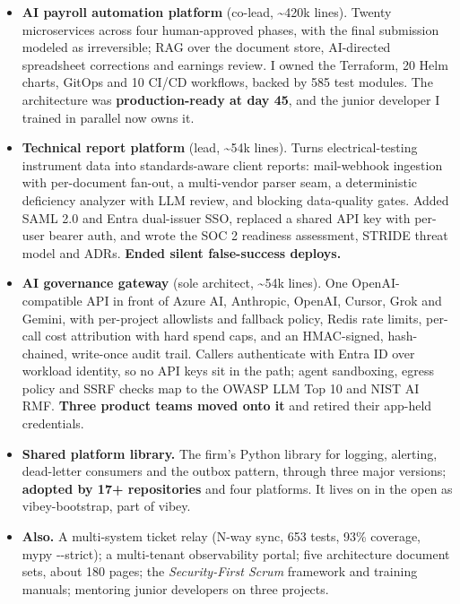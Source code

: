 \documentclass[10pt,letterpaper]{article}
\begin{document}
\begin{itemize}
\item \textbf{AI payroll automation platform} {\color{muted}(co-lead, \textasciitilde{}420k lines)}. Twenty microservices across four human-approved phases, with the final submission modeled as irreversible; RAG over the document store, AI-directed spreadsheet corrections and earnings review. I owned the Terraform, 20 Helm charts, GitOps and 10 CI/CD workflows, backed by 585 test modules. The architecture was \textbf{production-ready at day 45}, and the junior developer I trained in parallel now owns it.
\item \textbf{Technical report platform} {\color{muted}(lead, \textasciitilde{}54k lines)}. Turns electrical-testing instrument data into standards-aware client reports: mail-webhook ingestion with per-document fan-out, a multi-vendor parser seam, a deterministic deficiency analyzer with LLM review, and blocking data-quality gates. Added SAML 2.0 and Entra dual-issuer SSO, replaced a shared API key with per-user bearer auth, and wrote the SOC 2 readiness assessment, STRIDE threat model and ADRs. \textbf{Ended silent false-success deploys.}
\item \textbf{AI governance gateway} {\color{muted}(sole architect, \textasciitilde{}54k lines)}. One OpenAI-compatible API in front of Azure AI, Anthropic, OpenAI, Cursor, Grok and Gemini, with per-project allowlists and fallback policy, Redis rate limits, per-call cost attribution with hard spend caps, and an HMAC-signed, hash-chained, write-once audit trail. Callers authenticate with Entra ID over workload identity, so no API keys sit in the path; agent sandboxing, egress policy and SSRF checks map to the OWASP LLM Top 10 and NIST AI RMF. \textbf{Three product teams moved onto it} and retired their app-held credentials.
\item \textbf{Shared platform library.} The firm's Python library for logging, alerting, dead-letter consumers and the outbox pattern, through three major versions; \textbf{adopted by 17+ repositories} and four platforms. It lives on in the open as vibey-bootstrap, part of vibey.
\item \textbf{Also.} A multi-system ticket relay (N-way sync, 653 tests, 93\% coverage, mypy -{}-strict); a multi-tenant observability portal; five architecture document sets, about 180 pages; the \textit{Security-First Scrum} framework and training manuals; mentoring junior developers on three projects.
\end{itemize}
\end{document}
